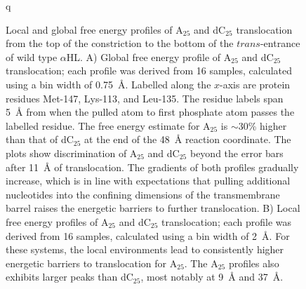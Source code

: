 \documentclass[a4paper,10pt]{article}
\newcommand{\dctf}{dC$_{25}$ }
\newcommand{\dctfnsp}{dC$_{25}$}
\newcommand{\atf}{A$_{25}$ }
\newcommand{\atfnsp}{A$_{25}$}
\newcommand{\ahl}{$\alpha$HL }
\newcommand{\ahlnsp}{$\alpha$HL}
\begin{document}
 \begin{figure}[!h]
  \begin{center}
    \end{center}
q    \caption[Local and global free energy profiles of \atf and \dctf translocation from the top of the constriction to the bottom of the $trans$-entrance of wild type \ahl]{Local and global free energy profiles of \atf and \dctf translocation from the top of the constriction to the bottom of the $trans$-entrance of wild type \ahlnsp. A) Global free energy profile of \atf and \dctf
translocation; each profile was derived from 16 samples, calculated using a bin width of 0.75~{\AA}. Labelled along the $x$-axis are protein residues Met-147, Lys-113, and Leu-135. The residue labels span 5~{\AA} from when the pulled atom to first
phosphate atom passes the labelled residue. The free energy estimate for \atf is $\sim$30\% higher than that of \dctf at the end of the 48~{\AA} reaction coordinate. The plots show discrimination of \atf and \dctf beyond the error bars after 11~{\AA} of translocation. The gradients of both profiles gradually increase, which is in line with expectations that pulling additional nucleotides into the confining dimensions of the transmembrane barrel raises the energetic barriers to further translocation. B) Local free energy profiles of \atf and \dctf translocation; each profile was derived from 16 samples, calculated using a bin width of 2~{\AA}. For these systems, the local environments lead to consistently higher energetic barriers to translocation for \atfnsp. The \atf profiles also exhibits larger peaks than \dctfnsp, most notably at 9~{\AA} and 37~{\AA}.}

\end{figure}
\end{document}
